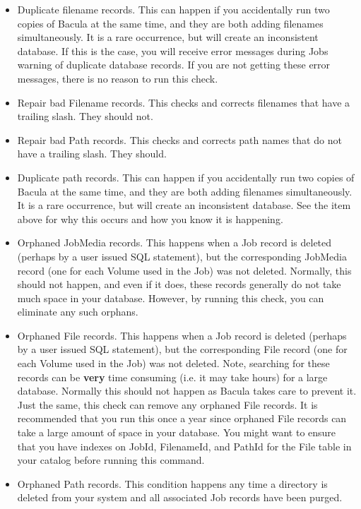 \begin{itemize}
\item Duplicate filename records. This can happen if you accidentally run  two
   copies of Bacula at the same time, and they are both adding  filenames
   simultaneously. It is a rare occurrence, but will create  an inconsistent
   database. If this is the case, you will receive  error messages during Jobs
   warning of duplicate database records.  If you are not getting these error
   messages, there is no reason  to run this check. 
\item Repair bad Filename records. This checks and corrects filenames  that
   have a trailing slash. They should not.  
\item Repair bad Path records. This checks and corrects path names  that do
   not have a trailing slash. They should.  
\item Duplicate path records. This can happen if you accidentally run  two
   copies of Bacula at the same time, and they are both adding  filenames
   simultaneously. It is a rare occurrence, but will create  an inconsistent
   database. See the item above for why this occurs and  how you know it is
   happening. 
\item Orphaned JobMedia records. This happens when a Job record is deleted 
   (perhaps by a user issued SQL statement), but the corresponding  JobMedia
   record (one for each Volume used in the Job) was not deleted.  Normally, this
   should not happen, and even if it does, these records  generally do not take
   much space in your database. However, by running  this check, you can
   eliminate any such orphans.  
\item Orphaned File records. This happens when a Job record is deleted 
   (perhaps by a user issued SQL statement), but the corresponding  File record
   (one for each Volume used in the Job) was not deleted.  Note, searching for
   these records can be {\bf very} time consuming (i.e.  it may take hours) for a
   large database. Normally this should not  happen as Bacula takes care to
   prevent it. Just the same, this  check can remove any orphaned File records.
   It is recommended that  you run this once a year since orphaned File records
   can take a  large amount of space in your database. You might
   want to ensure that you have indexes on JobId, FilenameId, and
   PathId for the File table in your catalog before running this
   command.
\item Orphaned Path records. This condition happens any time a directory is 
   deleted from your system and all associated Job records have been purged. 

\end{itemize}
